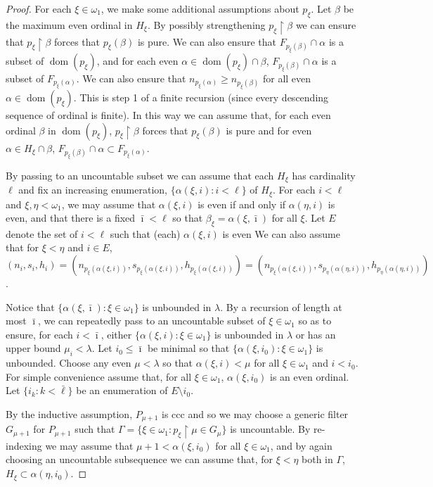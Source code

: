 \documentclass{amsart}
\theoremstyle{definition}
\theoremstyle{remark}
\def\dom{\operatorname{dom}}
\begin{document}
\begin{proof}
 For each $\xi\in\omega_1$, we make some additional assumptions
 about $p_\xi$. Let $\beta$ be the maximum even ordinal in $H_\xi$. 
 By possibly strengthening $p_\xi\restriction \beta$ we can ensure
 that $p_\xi\restriction \beta$ forces that $p_\xi(\beta)$ is pure. 
 We can also ensure that $F_{p_\xi(\beta)} \cap \alpha $ is a subset
 of $\dom(p_\xi)$, and  for each even $\alpha\in \dom(p_\xi)\cap \beta$,
 $F_{p_\xi(\beta )}\cap \alpha $ is a subset of $F_{p_\xi(\alpha)}$.   
 We can also ensure that $n_{p_\xi(\alpha)}\geq  n_{p_\xi(\beta)}  $ 
 for all even $\alpha\in \dom(p_\xi)$.
 This is step 1 of a finite recursion (since every descending
 sequence of ordinal is finite).  In this way we can 
 assume that, for each even ordinal $\beta$ in $\dom(p_\xi)$,
  $p_\xi\restriction \beta$ forces that $p_\xi(\beta)$ 
  is pure 
 and for even $\alpha\in H_\xi\cap \beta$,
 $F_{p_\xi(\beta)}\cap \alpha \subset
  F_{p_\xi(\alpha)}$.
  
 
 By passing to an uncountable subset we can 
 assume that each $H_\xi$ has cardinality $\ell$ and fix
 an increasing enumeration, $\{ \alpha(\xi,i) : i<\ell\}$ of $H_\xi$. 
 For each $i<\ell$ and $\xi,\eta<\omega_1$, we may assume
 that $\alpha(\xi,i)$ is even if and only if $\alpha(\eta,i)$ is even,
 and that  there is a fixed $\bar \imath<\ell$ so
 that $\beta_\xi  = \alpha(\xi, \bar \imath)$ for all $\xi$. 
 Let $E$ denote the set of $i<\ell$ such that (each)
  $\alpha(\xi,i)$ is even
We can also assume that for $\xi <\eta$ and $i\in E $,
$(n_i, s_i, h_i) =  
 (n_{p_\xi( \alpha(\xi,i))} , s_{p_\xi( \alpha(\xi,i))} , h_{p_\xi( \alpha(\xi,i))} ) = 
(n_{p_\xi( \alpha(\xi,i))} , s_{p_\eta(\alpha(\eta,   i))} , h_{p_\eta(\alpha(\eta,i))})
$.
 
 Notice that $\{ \alpha(\xi,\bar \imath) : \xi\in\omega_1\}$
 is unbounded in $\lambda$. 
 By a recursion of length at most $\bar \imath$, we can repeatedly
 pass to an uncountable subset of $\xi\in\omega_1$ so as to ensure,
  for each $i<\bar \imath$, either $\{ \alpha(\xi,i) : \xi\in\omega_1\}$
   is unbounded in $\lambda$ or has an upper bound $\mu_i<\lambda$.
   Let $i_0 \leq  \bar \imath$ be minimal so that 
    $\{ \alpha(\xi,i_0) : \xi\in\omega_1\}$ is unbounded. 
    Choose any even $\mu<\lambda$ so that $\alpha(\xi,i)<\mu$
    for all $\xi\in\omega_1$ and $i<i_0$. 
    For simple convenience assume that,
    for all $\xi\in\omega_1$, $\alpha(\xi,i_0)$ is an even ordinal. 
 Let   $\{ i_k : k <\bar\ell\} $ be an enumeration of
  $E\setminus i_0$.

By the inductive assumption, $P_{\mu+1}$ is ccc and so we may
choose a generic filter $G_{\mu+1}$ for $P_{\mu+1}$ such
that $\Gamma = \{ \xi \in\omega_1 : p_\xi \restriction \mu \in G_\mu\}$ is
uncountable. By re-indexing we may assume that $\mu+1< \alpha(\xi,i_0)$
for all $\xi\in\omega_1$, and by again choosing an
uncountable subsequence
 we can assume that, for $\xi<\eta$ both in $\Gamma$,
   $H_\xi \subset \alpha(\eta,i_0)$.


\end{proof}
\end{document}
